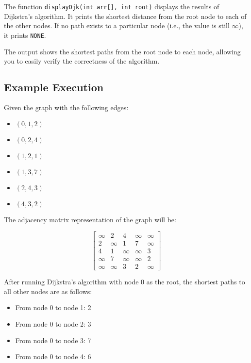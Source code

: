 \documentclass{book}
\begin{document}
The function \texttt{displayDjk(int arr[], int root)} displays the results of Dijkstra’s algorithm. It prints the shortest distance from the root node to each of the other nodes. If no path exists to a particular node (i.e., the value is still \(\infty\)), it prints \texttt{NONE}.

The output shows the shortest paths from the root node to each node, allowing you to easily verify the correctness of the algorithm.

\subsection{Example Execution}

Given the graph with the following edges:
\begin{itemize}
    \item \( (0, 1, 2) \)
    \item \( (0, 2, 4) \)
    \item \( (1, 2, 1) \)
    \item \( (1, 3, 7) \)
    \item \( (2, 4, 3) \)
    \item \( (4, 3, 2) \)
\end{itemize}

The adjacency matrix representation of the graph will be:

\[
\begin{bmatrix}
\infty & 2 & 4 & \infty & \infty \\
2 & \infty & 1 & 7 & \infty \\
4 & 1 & \infty & \infty & 3 \\
\infty & 7 & \infty & \infty & 2 \\
\infty & \infty & 3 & 2 & \infty
\end{bmatrix}
\]

After running Dijkstra’s algorithm with node 0 as the root, the shortest paths to all other nodes are as follows:

\begin{itemize}
    \item From node 0 to node 1: 2
    \item From node 0 to node 2: 3
    \item From node 0 to node 3: 7
    \item From node 0 to node 4: 6
\end{itemize}

\onecolumn
\end{document}
